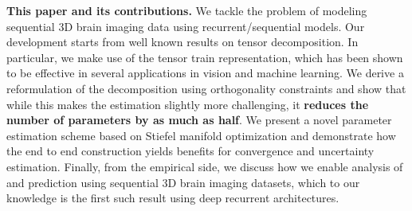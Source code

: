 {\bf This paper and its contributions.}
We tackle the problem of modeling 
sequential 3D brain imaging data using 
recurrent/sequential models. 
Our development starts from well known results on tensor decomposition. In particular, we 
make use of the tensor train representation, which has been shown to be effective in several 
applications in vision and machine learning. We derive a reformulation of the decomposition using 
orthogonality constraints and show that while this makes the estimation slightly more challenging, 
it {\bf reduces the number of parameters by as much as half}. 
We present a novel parameter estimation scheme based on Stiefel manifold optimization and demonstrate 
how the end to end construction yields benefits for convergence and uncertainty estimation. 
Finally, from the empirical side, we discuss how we enable analysis of and prediction using sequential 3D brain imaging datasets, which to our knowledge is the first such result using 
deep recurrent architectures. 

















